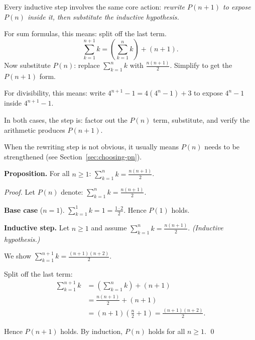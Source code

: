 \begin{remark}
Every inductive step involves the same core action: \emph{rewrite
$P(n+1)$ to expose $P(n)$ inside it, then substitute the inductive
hypothesis.}

For sum formulas, this means: split off the last term.
\[
\sum_{k=1}^{n+1} k = \left(\sum_{k=1}^n k\right) + (n+1).
\]
Now substitute $P(n)$: replace $\sum_{k=1}^n k$ with $\frac{n(n+1)}{2}$.
Simplify to get the $P(n+1)$ form.

For divisibility, this means: write $4^{n+1} - 1 = 4(4^n - 1) + 3$
to expose $4^n - 1$ inside $4^{n+1} - 1$.

In both cases, the step is: factor out the $P(n)$ term, substitute,
and verify the arithmetic produces $P(n+1)$.

When the rewriting step is not obvious, it usually means $P(n)$ needs
to be strengthened (see Section~\ref{sec:choosing-pn}).
\end{remark}

\begin{example}
\textbf{Proposition.}
For all $n \geq 1$:
$\displaystyle\sum_{k=1}^n k = \frac{n(n+1)}{2}$.

\medskip
\noindent\textit{Proof.}
Let $P(n)$ denote: $\displaystyle\sum_{k=1}^n k = \frac{n(n+1)}{2}$.

\medskip
\noindent\textbf{Base case} ($n=1$).
$\sum_{k=1}^1 k = 1 = \frac{1 \cdot 2}{2}$.
Hence $P(1)$ holds.

\medskip
\noindent\textbf{Inductive step.}
Let $n \geq 1$ and assume
$\displaystyle\sum_{k=1}^n k = \frac{n(n+1)}{2}$. \quad
\textit{(Inductive hypothesis.)}

We show $\displaystyle\sum_{k=1}^{n+1} k = \frac{(n+1)(n+2)}{2}$.

Split off the last term:
\begin{align*}
\sum_{k=1}^{n+1} k
&= \left(\sum_{k=1}^n k\right) + (n+1) \\
&= \frac{n(n+1)}{2} + (n+1)
  \tag{inductive hypothesis} \\
&= (n+1)\left(\frac{n}{2} + 1\right)
  = \frac{(n+1)(n+2)}{2}.
\end{align*}

Hence $P(n+1)$ holds. By induction, $P(n)$ holds for all $n \geq 1$. \qed
\end{example}

